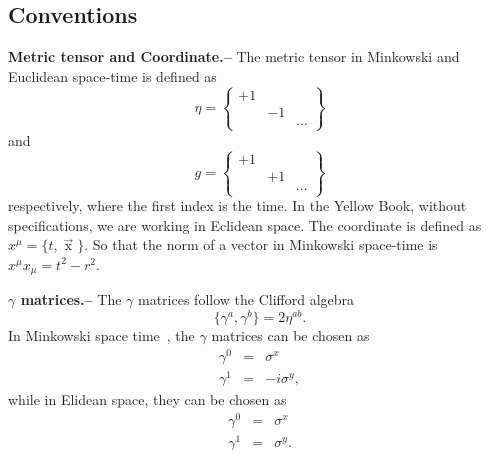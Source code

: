 \documentclass[submission, PhysLectNotes]{SciPost}
\begin{document}
\subsection{Conventions}
{\bf Metric tensor and Coordinate.--}  The metric tensor in Minkowski and Euclidean space-time is defined as
\begin{equation}
    \eta = \begin{Bmatrix}
        +1 &   &\\
           & -1& \\
           &   & \cdots
    \end{Bmatrix}
\end{equation}
and
\begin{equation}
    g = \begin{Bmatrix}
        +1 &   &\\
           & +1& \\
           &   & \cdots
    \end{Bmatrix}
\end{equation}
respectively, where the first index is the time. In the Yellow Book, without specifications, we are working in Eclidean space. The coordinate is defined as $x^\mu = \{t, \mathop{x}\limits^\rightarrow\}$. So that the norm of a vector in Minkowski space-time is $x^\mu x_\mu = t^2 - r^2$.

{\bf $\gamma$ matrices.--}   The $\gamma$ matrices follow the Clifford algebra
\begin{equation}
    \{\gamma^a,\gamma^b\} = 2\eta^{ab}.
\end{equation}
In Minkowski space time , the $\gamma$ matrices can be chosen as
\begin{eqnarray}
    \gamma^0 &=& \sigma^x \nonumber \\
    \gamma^1 &=&  -i\sigma^y,
\end{eqnarray}
while in Elidean space, they can be chosen as
\begin{eqnarray}
    \gamma^0 &=& \sigma^x \nonumber \\
    \gamma^1 &=& \sigma^y.
\end{eqnarray}
\end{document}
